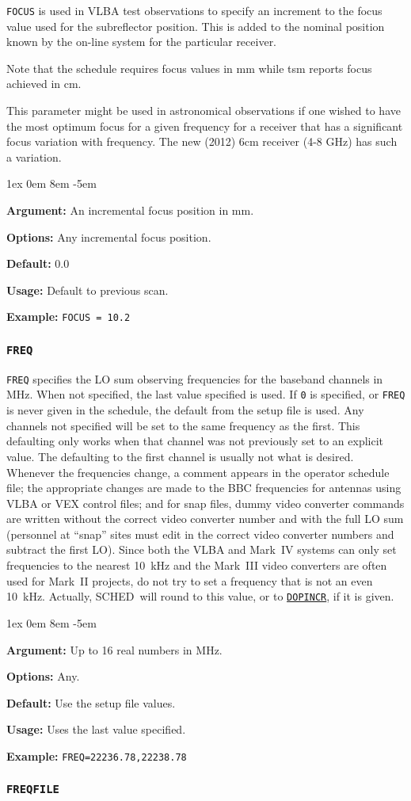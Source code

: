 \documentclass{report}
\newcommand{\schedb}{{\sc SCHED~}}
\newcommand{\rcwbox}[5]{
  \begin{list}{}{\parsep 1ex  \itemsep 0em
                 \leftmargin 8em  \itemindent -5em }
    \item {\bf Argument:} #1
    \item {\bf Options:}  #2
    \item {\bf Default:}  #3
    \item {\bf Usage:}    #4
    \item {\bf Example:}  #5
  \end{list}
}
\begin{document}
{\tt FOCUS} is used in VLBA test observations to specify an
increment to the focus value used for the subreflector position.
This is added to the nominal position known by the on-line system
for the particular receiver.

Note that the schedule requires focus values in mm while tsm
reports focus achieved in cm.

This parameter might be used in astronomical observations if one
wished to have the most optimum focus for a given frequency for a
receiver that has a significant focus variation with frequency.  The
new (2012) 6cm receiver (4-8 GHz) has such a variation.

\rcwbox
{An incremental focus position in mm.}
{Any incremental focus position.}
{0.0}
{Default to previous scan.}
{{\tt FOCUS = 10.2 }}

\subsubsection{\label{MP:FREQ}{\tt FREQ}}

{\tt FREQ} specifies the LO sum observing frequencies for the baseband
channels in MHz.  When not specified, the last value specified is
used. If {\tt 0} is specified, or {\tt FREQ} is never given in the
schedule, the default from the setup file is used.  Any channels not
specified will be set to the same frequency as the first.  This
defaulting only works when that channel was not previously set to an
explicit value.  The defaulting to the first channel is usually not
what is desired.  Whenever the frequencies change, a comment appears
in the operator schedule file; the appropriate changes are made to the
BBC frequencies for antennas using VLBA or VEX control files; and for
snap files, dummy video converter commands are written without the
correct video converter number and with the full LO sum (personnel at
``snap'' sites must edit in the correct video converter numbers and
subtract the first LO). Since both the VLBA and Mark~IV systems can
only set frequencies to the nearest 10~kHz and the Mark~III video
converters are often used for Mark~II projects, do not try to set a
frequency that is not an even 10~kHz.  Actually, \schedb will round to
this value, or to 
{\hyperref[MP:DOPINCR]{{\tt DOPINCR}}}, if it is given.


\rcwbox
{Up to 16 real numbers in MHz.}
{Any.}
{Use the setup file values.}
{Uses the last value specified.}
{{\tt FREQ=22236.78,22238.78}}


\subsubsection{\label{MP:FREQFILE}{\tt FREQFILE}}
\end{document}
